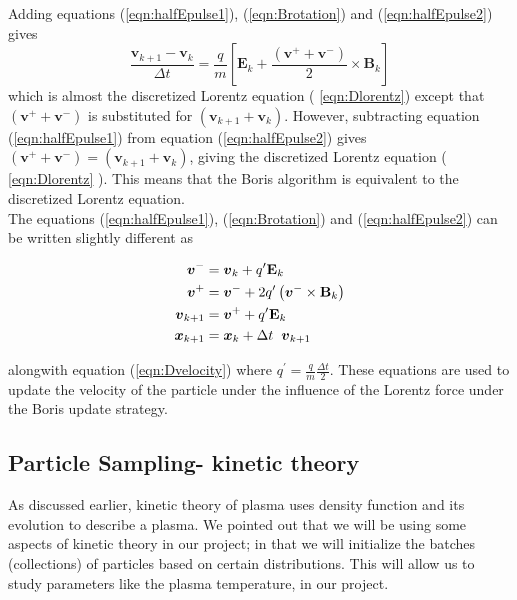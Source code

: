 \documentclass[12pt]{article}
\begin{document}
	\noindent Adding equations (\ref{eqn:halfEpulse1}), (\ref{eqn:Brotation}) and (\ref{eqn:halfEpulse2}) gives
	$$ \label{eqn:Dlorentz}
	\frac{\boldsymbol{v}_{k+1} - \boldsymbol{v}_{k}}{\Delta t} = \frac{q}{m} \left[\mathbf{E}_{k} + \frac{\left( \boldsymbol{v}^{+} + \boldsymbol{v}^{-} \right) }{2} \times \mathbf{B}_{k} \right] $$ which is almost the discretized Lorentz equation ( \ref{eqn:Dlorentz}) except that $\left( \boldsymbol{v}^{+} + \boldsymbol{v}^{-} \right) $ is substituted for $\left( \boldsymbol{v}_{k+1} + \boldsymbol{v}_{k}\right) $. However, subtracting equation (\ref{eqn:halfEpulse1}) from equation (\ref{eqn:halfEpulse2}) gives $\left( \boldsymbol{v}^{+} + \boldsymbol{v}^{-} \right) = \left( \boldsymbol{v}_{k+1} + \boldsymbol{v}_{k}\right) $, giving the discretized Lorentz equation ( \ref{eqn:Dlorentz} ). This means that the Boris algorithm is equivalent to the discretized Lorentz equation. \\
	
	\noindent
	The equations (\ref{eqn:halfEpulse1}), (\ref{eqn:Brotation}) and (\ref{eqn:halfEpulse2}) can be written slightly different as 
	
	\begin{center}
		\begin{tcolorbox}[width=8cm]
			
			\begin{equation}
				\begin{split}
					\boldsymbol{v}^{-} & = \boldsymbol{v}_{k} + q^{\prime} \mathbf{E}_{k} \\
					\boldsymbol{v}^{+} & = \boldsymbol{v}^{-} + 2 q^{\prime} \left( \boldsymbol{v}^{-} \times \mathbf{B}_{k} \right) \\
					\boldsymbol{v}_{k+1} & = \boldsymbol{v}^{+} + q^{\prime} \mathbf{E}_{k} \\
					\boldsymbol{x}_{k+1} & = \boldsymbol{x}_{k} + \Delta t \hspace{0.2cm}\boldsymbol{v}_{k+1}
				\end{split}	 			
			\end{equation}
		\end{tcolorbox}
	\end{center}
	
	alongwith equation (\ref{eqn:Dvelocity}) where $q^{\prime} = \frac{\displaystyle q}{\displaystyle m} \frac{\displaystyle \Delta t}{ 2}$. These equations are used to update the velocity of the particle under the influence of the Lorentz force under the Boris update strategy.
	
	\subsection{Particle Sampling- kinetic theory}
	As discussed earlier, kinetic theory of plasma uses density function and its evolution to describe a plasma. We pointed out that we will be using some aspects of kinetic theory in our project; in that we will initialize the batches (collections) of particles based on certain distributions. This will allow us to study parameters like the plasma temperature, in our project. \\
	
\end{document}
